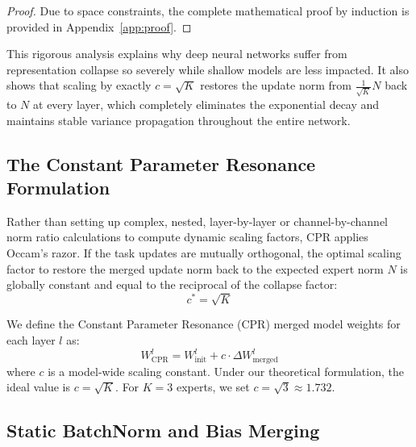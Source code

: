 \documentclass{article}
\theoremstyle{plain}
\theoremstyle{definition}
\theoremstyle{remark}
\begin{document}
\begin{proof}
Due to space constraints, the complete mathematical proof by induction is provided in Appendix~\ref{app:proof}.
\end{proof}

This rigorous analysis explains why deep neural networks suffer from representation collapse so severely while shallow models are less impacted. It also shows that scaling by exactly $c = \sqrt{K}$ restores the update norm from $\frac{1}{\sqrt{K}} N$ back to $N$ at every layer, which completely eliminates the exponential decay and maintains stable variance propagation throughout the entire network.

\subsection{The Constant Parameter Resonance Formulation}

Rather than setting up complex, nested, layer-by-layer or channel-by-channel norm ratio calculations to compute dynamic scaling factors, CPR applies Occam's razor. If the task updates are mutually orthogonal, the optimal scaling factor to restore the merged update norm back to the expected expert norm $N$ is globally constant and equal to the reciprocal of the collapse factor:
\begin{equation}
c^* = \sqrt{K}
\end{equation}

We define the Constant Parameter Resonance (CPR) merged model weights for each layer $l$ as:
\begin{equation}
W_{\text{CPR}}^l = W_{\text{init}}^l + c \cdot \Delta W_{\text{merged}}^l
\end{equation}
where $c$ is a model-wide scaling constant. Under our theoretical formulation, the ideal value is $c = \sqrt{K}$. For $K=3$ experts, we set $c = \sqrt{3} \approx 1.732$.

\subsection{Static BatchNorm and Bias Merging}
\end{document}
